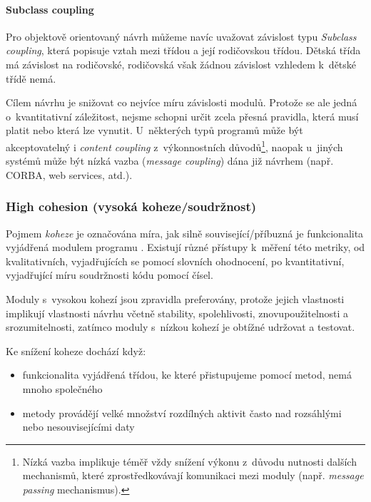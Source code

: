 \vspace{0.5cm}

\paragraph{Subclass coupling} Pro objektově orientovaný návrh můžeme navíc uvažovat závislost typu \emph{Subclass coupling}, která popisuje vztah mezi třídou a její rodičovskou třídou. Dětská třída má závislost na rodičovské, rodičovská však žádnou závislost vzhledem k~dětské třídě nemá.

\vspace{1.0cm}

Cílem návrhu je snižovat co nejvíce míru závislosti modulů. Protože se ale jedná o~kvantitativní záležitost, nejsme schopni určit zcela přesná pravidla, která musí platit nebo která lze vynutit. U~některých typů programů může být akceptovatelný i \emph{content coupling} z~výkonnostních důvodů\footnote{Nízká vazba implikuje téměř vždy snížení výkonu z~důvodu nutnosti dalších mechanismů, které zprostředkovávají komunikaci mezi moduly (např. \emph{message passing} mechanismus).}, naopak u~jiných systémů může být nízká vazba (\emph{message coupling}) dána již návrhem (např. CORBA, web services, atd.).

\subsubsection{High cohesion (vysoká koheze/soudržnost)}
Pojmem \emph{koheze} je označována míra, jak silně související/příbuzná je funkcionalita vyjádřená modulem programu \cite{wiki:cohesion}. Existují různé přístupy k~měření této metriky, od kvalitativních, vyjadřujících se pomocí slovních ohodnocení, po kvantitativní, vyjadřující míru soudržnosti kódu pomocí čísel.

Moduly s~vysokou kohezí jsou zpravidla preferovány, protože jejich vlastnosti implikují  vlastnosti návrhu včetně stability, spolehlivosti, znovupoužitelnosti a srozumitelnosti, zatímco moduly s~nízkou kohezí je obtížné udržovat a testovat.

Ke snížení koheze dochází když:
\begin{itemize}
\item funkcionalita vyjádřená třídou, ke které přistupujeme pomocí metod, nemá mnoho společného
\item metody provádějí velké množství rozdílných aktivit často nad rozsáhlými nebo nesouvisejícími daty
\end{itemize}

